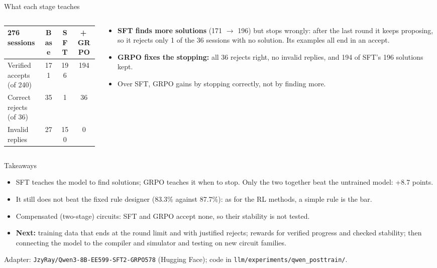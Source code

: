 \begin{frame}{What each stage teaches}
  \begin{columns}[c]
    \begin{column}{0.53\textwidth}
      \centering\footnotesize
      \begin{tabular}{@{}lccc@{}}
        \toprule
        276 sessions & Base & SFT & +\,GRPO \\
        \midrule
        Verified accepts (of 240) & 171 & 196 & 194 \\
        Correct rejects (of 36) & 35 & \alert{1} & 36 \\
        Invalid replies & 27 & \alert{150} & 0 \\
        \bottomrule
      \end{tabular}
    \end{column}
    \begin{column}{0.45\textwidth}
      \small
      \begin{itemize}
        \item \textbf{SFT finds more solutions} (171 $\to$ 196) but stops wrongly: after the last round it keeps
          proposing, so it rejects only 1 of the 36 sessions with no solution. Its examples all end in an accept.
        \item \textbf{GRPO fixes the stopping:} all 36 rejects right, no invalid replies, and 194 of SFT's 196
          solutions kept.
        \item Over SFT, GRPO gains by stopping correctly, not by finding more.
      \end{itemize}
    \end{column}
  \end{columns}
\end{frame}

\begin{frame}{Takeaways}
  \begin{itemize}
    \item SFT teaches the model to find solutions; GRPO teaches it when to stop. Only the two together beat the
      untrained model: +8.7 points.
    \item It still does not beat the fixed rule designer (83.3\% against 87.7\%): as for the RL methods, a simple
      rule is the bar.
    \item Compensated (two-stage) circuits: SFT and GRPO accept none, so their stability is not tested.
    \item \textbf{Next:} training data that ends at the round limit and with justified rejects; rewards for verified
      progress and checked stability; then connecting the model to the compiler and simulator and testing on new
      circuit families.
  \end{itemize}
  \vspace{2mm}
  {\footnotesize\color{uscgray} Adapter: \texttt{JzyRay/Qwen3-8B-EE599-SFT2-GRPO578} (Hugging Face); code in
  \texttt{llm/experiments/qwen\_posttrain/}.}
\end{frame}
